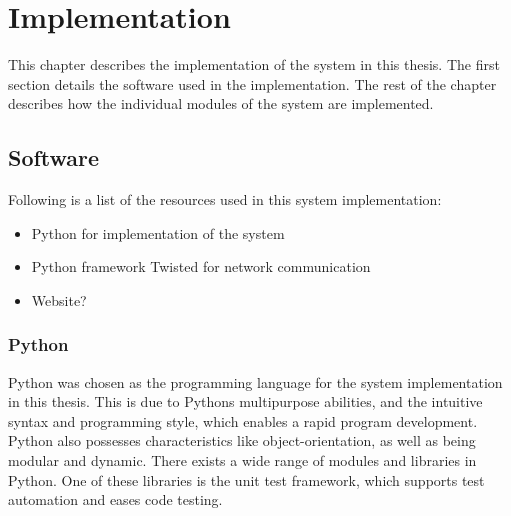 \chapter{Implementation}
This chapter describes the implementation of the system in this thesis. The first section details the software used in the implementation. The rest of the chapter describes how the individual modules of the system are implemented.
\section{Software}
Following is a list of the resources used in this system implementation:
\begin{itemize}
\item Python for implementation of the system
\item Python framework Twisted for network communication
\item Website?
\end{itemize}

\subsection{Python}
Python \cite{python} was chosen as the programming language for the system implementation in this thesis. This is due to Pythons multipurpose abilities, and the intuitive syntax and programming style, which enables a rapid program development. Python also possesses characteristics like object-orientation, as well as being modular and dynamic. There exists a wide range of modules and libraries in Python. One of these libraries is the unit test framework, which supports test automation and eases code testing.


